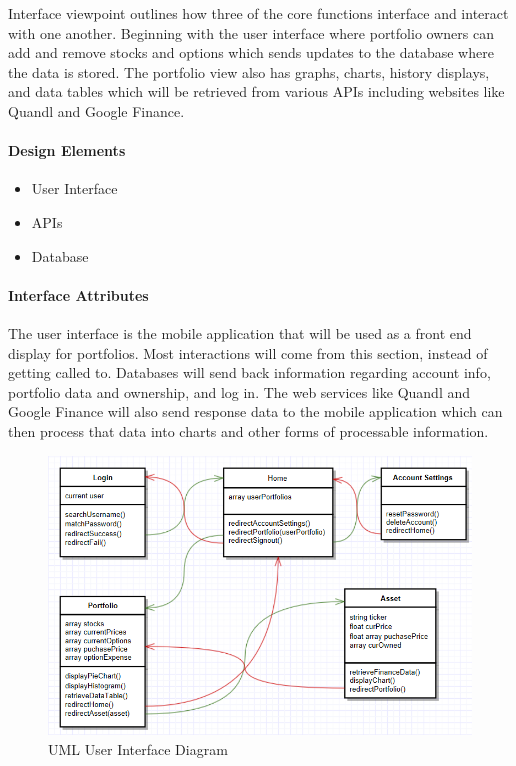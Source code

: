\documentclass[onecolumn, draftclsnofoot,10pt, compsoc]{IEEEtran}
\begin{document}
    Interface viewpoint outlines how three of the core functions interface and interact with one another.
    Beginning with the user interface where portfolio owners can add and remove stocks and options which
    sends updates to the database where the data is stored. The portfolio view also has graphs, charts, history displays,
    and data tables which will be retrieved from various APIs including websites like Quandl and Google Finance.
    
\paragraph{Design Elements}
    \begin{itemize}
        \item User Interface
        \item APIs
        \item Database
    \end{itemize}

\paragraph{Interface Attributes}

    The user interface is the mobile application that will be used as a front end display for portfolios. Most
    interactions will come from this section, instead of getting called to. Databases will send back information
    regarding account info, portfolio data and ownership, and log in. The web services like Quandl and Google 
    Finance will also send response data to the mobile application which can then process that data into charts 
    and other forms of processable information.

\begin{figure}[h]
\centering
\captionsetup{justification=centering}
\includegraphics[width=14cm]{design/frontend.png}
\caption{UML User Interface Diagram}
\end{figure}
    
\end{document}
